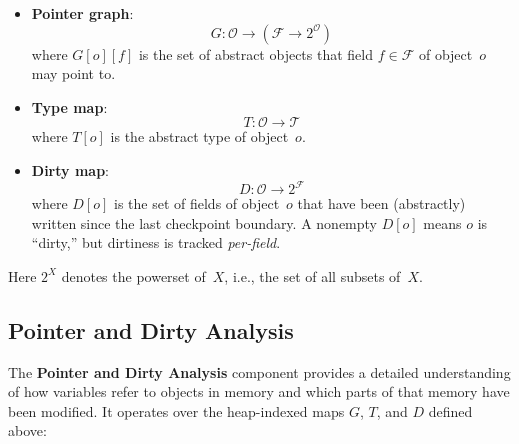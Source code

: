 \begin{itemize}
    \item \textbf{Pointer graph}:
    \[
        G : \mathcal{O} \to (\mathcal{F} \to 2^{\mathcal{O}})
    \]
    where $G[o][f]$ is the set of abstract objects that field $f \in \mathcal{F}$ of object~$o$
    may point to.  

    \item \textbf{Type map}:
    \[
        T : \mathcal{O} \to \mathcal{T}
    \]
    where $T[o]$ is the abstract type of object~$o$.

    \item \textbf{Dirty map}:
    \[
        D : \mathcal{O} \to 2^{\mathcal{F}}
    \]
    where $D[o]$ is the set of fields of object~$o$ that have been (abstractly) written since
    the last checkpoint boundary.  
    A nonempty $D[o]$ means $o$ is ``dirty,'' but dirtiness is tracked \emph{per-field}.
\end{itemize}

Here $2^X$ denotes the powerset of~$X$, i.e., the set of all subsets of~$X$.

\subsection{Pointer and Dirty Analysis}

The \textbf{Pointer and Dirty Analysis} component provides a detailed understanding
of how variables refer to objects in memory and which parts of that memory have been modified.
It operates over the heap-indexed maps $G$, $T$, and $D$ defined above:

